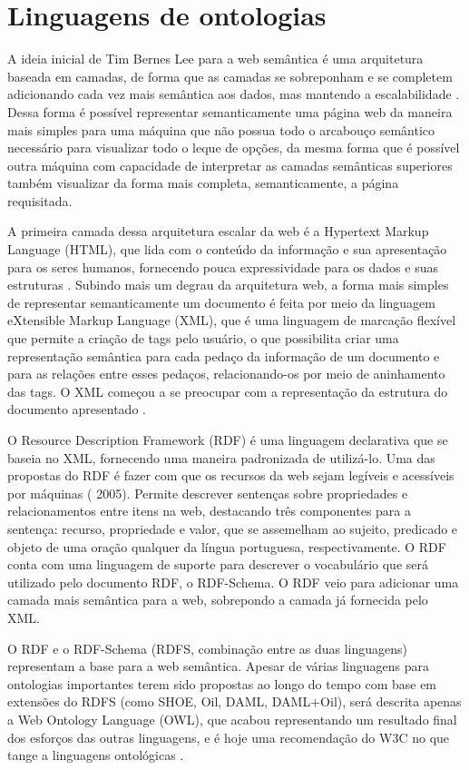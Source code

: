 \section{Linguagens de ontologias}

A ideia inicial de Tim Bernes Lee para a web semântica é uma arquitetura baseada em
camadas, de forma que as camadas se sobreponham e se completem adicionando cada vez
mais semântica aos dados, mas mantendo a escalabilidade \cite{breitman05}. Dessa forma
é possível representar semanticamente uma página web da maneira mais simples para uma
máquina que não possua todo o arcabouço semântico necessário para visualizar todo o leque
de opções, da mesma forma que é possível outra máquina com capacidade de interpretar as
camadas semânticas superiores também visualizar da forma mais completa, semanticamente,
a página requisitada.

A primeira camada dessa arquitetura escalar da web é a Hypertext Markup Language
(HTML), que lida com o conteúdo da informação e sua apresentação para os seres humanos,
fornecendo pouca expressividade para os dados e suas estruturas \cite{breitman05}.
Subindo mais um degrau da arquitetura web, a forma mais simples de representar
semanticamente um documento é feita por meio da linguagem eXtensible Markup Language
(XML), que é uma linguagem de marcação flexível que permite a criação de tags pelo
usuário, o que possibilita criar uma representação semântica para cada pedaço da informação
de um documento e para as relações entre esses pedaços, relacionando-os por meio de
aninhamento das tags. O XML começou a se preocupar com a representação da estrutura do
documento apresentado \cite{breitman05}.

O Resource Description Framework (RDF) é uma linguagem declarativa que se baseia
no XML, fornecendo uma maneira padronizada de utilizá-lo. Uma das propostas do RDF é
fazer com que os recursos da web sejam legíveis e acessíveis por máquinas (\cite{breitman05}
2005). Permite descrever sentenças sobre propriedades e relacionamentos entre itens na web,
destacando três componentes para a sentença: recurso, propriedade e valor, que se
assemelham ao sujeito, predicado e objeto de uma oração qualquer da língua portuguesa,
respectivamente. O RDF conta com uma linguagem de suporte para descrever o vocabulário
que será utilizado pelo documento RDF, o RDF-Schema. O RDF veio para adicionar uma
camada mais semântica para a web, sobrepondo a camada já fornecida pelo XML.

O RDF e o RDF-Schema (RDFS, combinação entre as duas linguagens) representam a
base para a web semântica. Apesar de várias linguagens para ontologias importantes terem
sido propostas ao longo do tempo com base em extensões do RDFS (como SHOE, Oil,
DAML, DAML+Oil), será descrita apenas a Web Ontology Language (OWL), que acabou
representando um resultado final dos esforços das outras linguagens, e é hoje uma
recomendação do W3C no que tange a linguagens ontológicas \cite{breitman05}.

